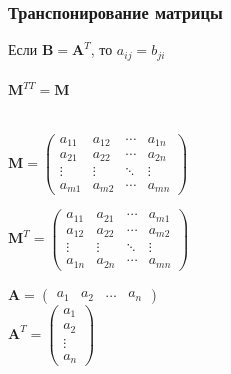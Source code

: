 \documentclass[10pt]{beamer}
\begin{document}
	\begin{frame}\frametitle{Транспонирование матрицы}
		
		Если $\mathbf B=\mathbf A^T$, то $a_{ij}=b_{ji}$ \\ ~ \\
		
		$\mathbf M ^ {TT} = \mathbf M$ \\ ~ \\
		
		{
			$\mathbf M =
			\begin{pmatrix} a_{11} & a_{12} & \cdots & a_{1n}
				\\a_{21} & a_{22} & \cdots & a_{2n}
				\\ \vdots & \vdots & \ddots & \vdots
				\\ a_{m1} & a_{m2} & \cdots & a_{mn}
			\end{pmatrix} 
			$
			
			$\mathbf M^T =
			\begin{pmatrix} a_{11} & a_{21} & \cdots & a_{m1}
				\\a_{12} & a_{22} & \cdots & a_{m2}
				\\ \vdots & \vdots & \ddots & \vdots
				\\ a_{1n} & a_{2n} & \cdots & a_{mn}
			\end{pmatrix} 
			$ 
		}
		{
			$\mathbf A = \begin{pmatrix}
				a_1 & a_2 & \ldots & a_n
			\end{pmatrix}$ \\
			$\mathbf A^T = \begin{pmatrix}
				a_1 \\ a_2 \\ \vdots \\ a_n
			\end{pmatrix}$
		}
		
		
		
		
		
	\end{frame}
	
\end{document}
